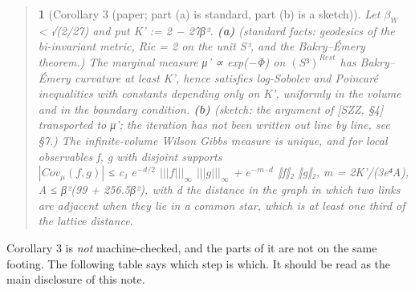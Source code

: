 \documentclass[11pt,a4paper]{article}
\theoremstyle{named}
\newtheorem*{namedthm}{}
\begin{document}
\begin{quote}
\begin{namedthm}[Corollary 3 (paper; part (a) is standard, part (b) is a sketch)]
Let $β_W$ \textless{} √(2/27) and put K' := 2 − 27β². \textbf{(a)} \textit{(standard facts: geodesics of the bi-invariant metric, Ric = 2 on the unit S³, and the Bakry–Émery theorem.)} The marginal measure μ' ∝ exp(−Φ) on $(S³)^{Rest}$ has Bakry–Émery curvature at least K', hence satisfies log-Sobolev and Poincaré inequalities with constants depending only on K', uniformly in the volume and in the boundary condition. \textbf{(b)} \textit{(sketch: the argument of [SZZ, §4] transported to μ'; the iteration has not been written out line by line, see §7.)} The infinite-volume Wilson Gibbs measure is unique, and for local observables f, g with disjoint supports\\
$|Cov_{μ}(f,g)|$ ≤ c₁ $e^{−d/2}$ $|||f|||_{∞}$ $|||g|||_{∞}$ + $e^{−m·d}$ ‖f‖₂ ‖g‖₂,  m = 2K'/(3e⁴A),  A ≤ β²(99 + 256.5β²), with d the distance in the graph in which two links are adjacent when they lie in a common star, which is at least one third of the lattice distance.
\end{namedthm}
\end{quote}
Corollary 3 is \textit{not} machine-checked, and the parts of it are not on the same footing. The following table says which step is which. It should be read as the main disclosure of this note.
\end{document}
